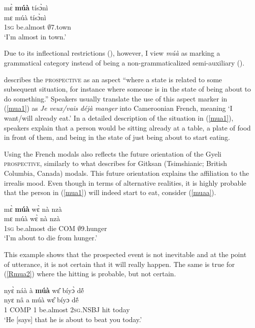 \begin{exe} 
\ex\label{Rmua1}
  \glll mɛ̀ {\bfseries múà} tísɔ̀nì  \\
       mɛ múà tísɔ̀nì  \\
         1\textsc{sg} be.almost $\emptyset$7.town    \\
    \trans `I'm almost in town.'
\end{exe}


\noindent Due to its inflectional restrictions (), however, I view {\itshape múà} as marking a grammatical category instead of being a non-grammaticalized semi-auxiliary ().

\citet[64]{comrie76} describes the \textsc{prospective}  as an aspect ``where a state is related to some subsequent situation, for instance where someone is in the state of being about to do something.''  Speakers usually translate the use of this aspect marker in (\ref{mua1}) as {\itshape Je veux/vais déjà manger} into Cameroonian French, meaning `I want/will already eat.' In a detailed description of the situation in (\ref{mua1}), speakers explain that a person would be sitting already at a table, a plate of food in front of them, and being in the state of just being about to start eating.

Using the French modals also reflects the future orientation of the Gyeli \textsc{prospective}, similarly to what \citet{matthewson2012} describes for Gitksan (Tsimshianic; British Columbia, Canada) modals. This future orientation explains the affiliation to the irrealis mood. Even though in terms of alternative realities, it is highly probable that the person in (\ref{mua1}) will indeed start to eat, consider (\ref{muaa}).  

\begin{exe} 
\ex\label{muaa}
  \glll  mɛ̀ {\bfseries múà} wɛ̀ nà nzà \\
        mɛ múà wɛ̀ nà nzà \\
          1\textsc{sg} be.almost die COM $\emptyset$9.hunger  \\
    \trans `I'm about to die from hunger.'
\end{exe}

\noindent This example shows that the prospected event is not inevitable and at the point of utterance, it is not certain that it will really happen. The same is true for (\ref{Rmua2}) where the hitting is probable, but not certain.

\begin{exe} 
\ex\label{Rmua2}
  \glll  nyɛ̀ náà à {\bfseries múà} wɛ̂ bíyɔ̀ dẽ́ \\
        nyɛ nâ a múà wɛ̂ bíyɔ dẽ́\\
           1 COMP 1 be.almost 2\textsc{sg}.NSBJ hit today \\
    \trans `He [says] that he is about to beat you today.'
\end{exe}


